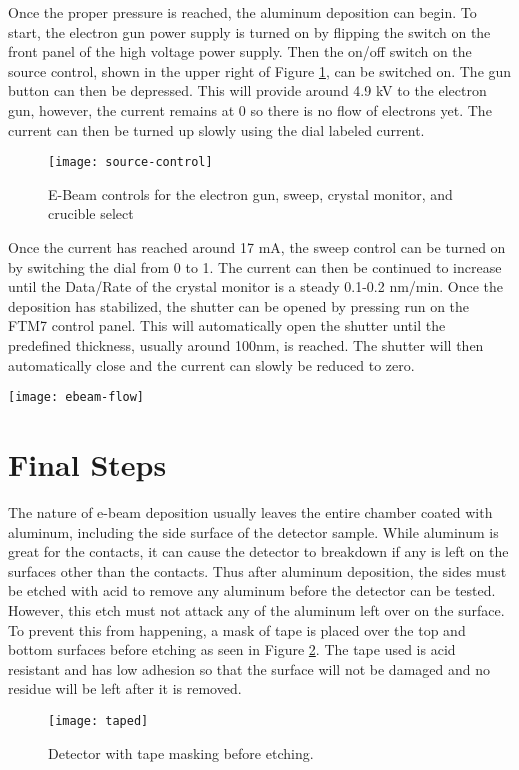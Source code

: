 Once the proper pressure is reached, the aluminum deposition can begin.
To start, the electron gun power supply is turned on by flipping the switch on the front panel of the high voltage power supply.
Then the on/off switch on the source control, shown in the upper right of Figure \ref{fig:source-control}, can be switched on.
The gun button can then be depressed.
This will provide around 4.9 kV to the electron gun, however, the current remains at 0 so there is no flow of electrons yet.
The current can then be turned up slowly using the dial labeled current.
\begin{figure}[htpb]
\centering
\texttt{[image: source-control]}
\caption{E-Beam controls for the electron gun, sweep, crystal monitor, and crucible select}
\label{fig:source-control}
\end{figure}

Once the current has reached around 17 mA, the sweep control can be turned on by switching the dial from 0 to 1.
The current can then be continued to increase until the Data/Rate of the crystal monitor is a steady 0.1-0.2 nm/min.
Once the deposition has stabilized, the shutter can be opened by pressing run on the FTM7 control panel.
This will automatically open the shutter until the predefined thickness, usually around 100nm, is reached.
The shutter will then automatically close and the current can slowly be reduced to zero.

\begin{sidewaysfigure}
\texttt{[image: ebeam-flow]}
\caption{This is a diagram of the of the electron beam machine.It is used to deposit aluminum onto the detector sample.}
\label{fig:ebeam-flow}
\end{sidewaysfigure}

\section{Final Steps}
The nature of e-beam deposition usually leaves the entire chamber coated with aluminum, including the side surface of the detector sample.
While aluminum is great for the contacts, it can cause the detector to breakdown if any is left on the surfaces other than the contacts.
Thus after aluminum deposition, the sides must be etched with acid to remove any aluminum before the detector can be tested.
However, this etch must not attack any of the aluminum left over on the surface.
To prevent this from happening, a mask of tape is placed over the top and bottom surfaces before etching as seen in Figure \ref{fig:taped}.
The tape used is acid resistant and has low adhesion so that the surface will not be damaged and no residue will be left after it is removed.
\begin{figure}[htpb]
\centering
\texttt{[image: taped]}
\caption{Detector with tape masking before etching.}
\label{fig:taped}
\end{figure}

